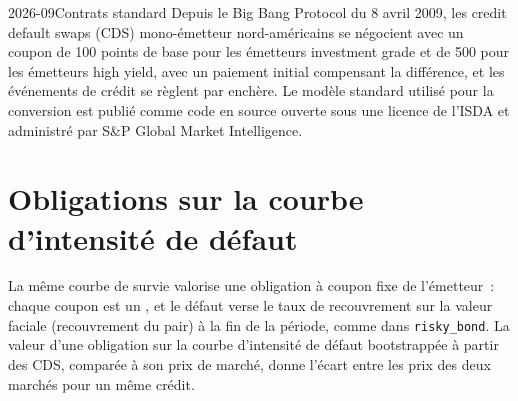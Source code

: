 \begin{omfigure}

\label{fig:rc:reduced-form-credit:upfront}
\end{omfigure}

\begin{dated}{2026-09}{Contrats standard}\label{dat:rc:reduced-form-credit:standard}
Depuis le Big Bang Protocol du 8 avril 2009, les credit default swaps (CDS) mono-émetteur nord-américains
se négocient avec un coupon de 100 points de base pour les émetteurs investment grade et de 500 pour les émetteurs
high yield, avec un paiement initial compensant la différence, et les événements de crédit se règlent par enchère.
Le modèle standard utilisé pour la conversion est publié comme code en source ouverte sous une
licence de l'ISDA et administré par S\&P Global Market Intelligence.
\end{dated}

\section{Obligations sur la courbe d'intensité de défaut}

La même courbe de survie valorise une obligation à coupon fixe de l'émetteur~: chaque coupon est un
, et le défaut verse le taux de recouvrement sur la valeur faciale (recouvrement
du pair) à la fin de la période, comme dans \texttt{risky\_bond}. La valeur d'une obligation sur la courbe
d'intensité de défaut bootstrappée à partir des CDS, comparée à son prix de marché, donne
l'écart entre les prix des deux marchés pour un même crédit.

